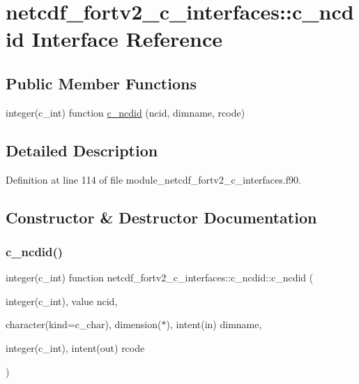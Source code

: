 \hypertarget{interfacenetcdf__fortv2__c__interfaces_1_1c__ncdid}{}\section{netcdf\+\_\+fortv2\+\_\+c\+\_\+interfaces\+:\+:c\+\_\+ncdid Interface Reference}
\label{interfacenetcdf__fortv2__c__interfaces_1_1c__ncdid}
\subsection*{Public Member Functions}
\begin{DoxyCompactItemize}
\item 
integer(c\+\_\+int) function \hyperlink{interfacenetcdf__fortv2__c__interfaces_1_1c__ncdid_a236b908af3990cd8470853dd2bb1583d}{c\+\_\+ncdid} (ncid, dimname, rcode)
\end{DoxyCompactItemize}


\subsection{Detailed Description}


Definition at line 114 of file module\+\_\+netcdf\+\_\+fortv2\+\_\+c\+\_\+interfaces.\+f90.



\subsection{Constructor \& Destructor Documentation}
\mbox{\label{interfacenetcdf__fortv2__c__interfaces_1_1c__ncdid_a236b908af3990cd8470853dd2bb1583d}} 
\subsubsection{\texorpdfstring{c\+\_\+ncdid()}{c\_ncdid()}}
{\footnotesize\ttfamily integer(c\+\_\+int) function netcdf\+\_\+fortv2\+\_\+c\+\_\+interfaces\+::c\+\_\+ncdid\+::c\+\_\+ncdid (\begin{DoxyParamCaption}\item[{integer(c\+\_\+int), value}]{ncid,  }\item[{character(kind=c\+\_\+char), dimension($\ast$), intent(in)}]{dimname,  }\item[{integer(c\+\_\+int), intent(out)}]{rcode }\end{DoxyParamCaption})}



